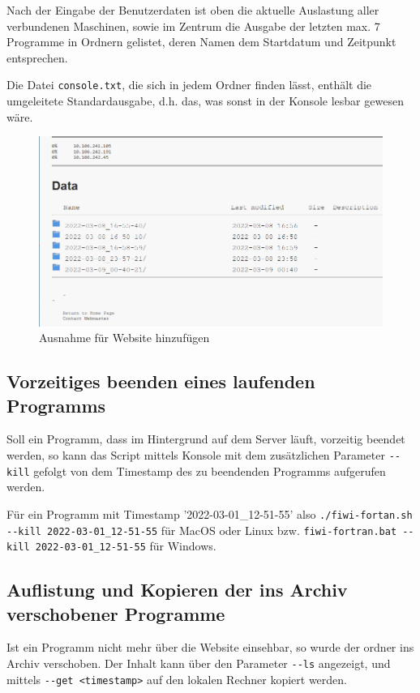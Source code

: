 \documentclass[11pt, a4paper]{article}
\begin{document}
Nach der Eingabe der Benutzerdaten ist oben die aktuelle Auslastung aller verbundenen Maschinen, sowie im Zentrum die Ausgabe der letzten max. 7 Programme in Ordnern gelistet, deren Namen dem Startdatum und Zeitpunkt entsprechen.

Die Datei \texttt{console.txt}, die sich in jedem Ordner finden lässt, enthält die umgeleitete Standardausgabe, d.h. das, was sonst in der Konsole lesbar gewesen wäre.

\begin{figure}[h]
    \centering
    \includegraphics[width=0.7\linewidth]{./pics/2022-03-09_01-18.png}
    \caption{Ausnahme für Website hinzufügen}
    \label{fig:web-1}
\end{figure}


\subsection{Vorzeitiges beenden eines laufenden Programms}

Soll ein Programm, dass im Hintergrund auf dem Server läuft, vorzeitig beendet werden, so kann das Script mittels Konsole mit dem zusätzlichen Parameter \texttt{-{}-kill} gefolgt von dem Timestamp des zu beendenden Programms aufgerufen werden.

Für ein Programm mit Timestamp '2022-03-01\_12-51-55' also
\newline\texttt{./fiwi-fortan.sh -{}-kill 2022-03-01\_12-51-55} für MacOS oder Linux bzw.
\newline\texttt{fiwi-fortran.bat -{}-kill 2022-03-01\_12-51-55} für Windows.

\subsection{Auflistung und Kopieren der ins Archiv verschobener Programme}
Ist ein Programm nicht mehr über die Website einsehbar, so wurde der ordner ins Archiv verschoben.
Der Inhalt kann über den Parameter \newline\texttt{-{}-ls} angezeigt, und mittels \newline\texttt{-{}-get <timestamp>} auf den lokalen Rechner kopiert werden.
\end{document}
